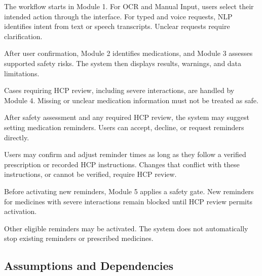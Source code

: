 The workflow starts in Module 1. For OCR and
Manual Input, users select their intended action
through the interface. For typed and voice requests,
NLP identifies intent from text or speech transcripts.
Unclear requests require clarification.

After user confirmation, Module 2 identifies
medications, and Module 3 assesses supported
safety risks. The system then displays results,
warnings, and data limitations.

Cases requiring HCP review, including severe
interactions, are handled by Module 4.
Missing or unclear medication information
must not be treated as safe.

After safety assessment and any required
HCP review, the system may suggest setting
medication reminders. Users can accept,
decline, or request reminders directly.

Users may confirm and adjust reminder times
as long as they follow a verified prescription
or recorded HCP instructions. Changes that
conflict with these instructions, or cannot
be verified, require HCP review.

Before activating new reminders, Module 5
applies a safety gate. New reminders for
medicines with severe interactions remain
blocked until HCP review permits activation.

Other eligible reminders may be activated.
The system does not automatically stop
existing reminders or prescribed medicines.

\subsection{Assumptions and Dependencies}

